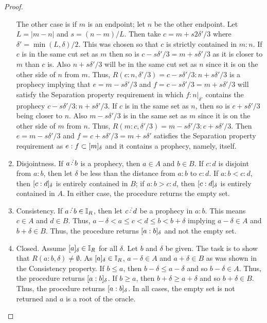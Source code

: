 \documentclass[12pt]{article}
\begin{document}
\begin{proof}
\begin{enumerate}
    The other case is if $m$ is an endpoint; let $n$ be the other endpoint. Let $L = |m-n|$ and $s = (n-m)/L$. Then take $c = m + s2\delta'/3$ where $\delta' = \min(L, \delta)/2$. This was chosen so that $c$ is strictly contained in $m:n$. If $c$ is in the same cut set as $m$ then so is $c -s \delta'/3 = m +s \delta'/3$ as it is closer to $m$ than $c$ is. Also $n + s \delta'/3$ will be in the same cut set as $n$ since it is on the other side of $n$ from $m$. Thus, $R(c:n, \delta'/3) = c-s\delta'/3 : n+s \delta'/3$ is a prophecy implying that $e=m-s\delta'/3$ and $f=c-s\delta'/3 = m + s \delta'/3$ will satisfy the Separation property requirement in which $f:n|_{\delta'}$ contains  the prophecy $c-s\delta'/3 : n+s\delta'/3$. If $c$ is in the same set as $n$, then so is $c + s \delta'/3$ being closer to $n$. Also $m-s \delta'/3$ is in the same set as $m$ since it is on the other side of $m$ from $n$.  Thus, $R(m:c, \delta'/3) =  m-s\delta'/3:c+s\delta'/3$. Then $e = m-s \delta'/3$ and $f = c + s\delta'/3 = m + s\delta'$ satisfies the Separation property requirement as $e:f \subset [m]_{\delta}$ and it contains a prophecy, namely, itself. 

    \item Disjointness. If $a\lte b$ is a prophecy, then $a \in A$ and $b \in B$. If $c:d$ is disjoint from $a:b$, then let $\delta$ be less than the distance from $a:b$ to $c:d$. If $a:b < c:d$, then $[c:d]_{\delta}$ is entirely contained in $B$; if $a:b > c:d$, then $[c:d]_{\delta}$ is entirely contained in $A$. In either case, the procedure returns the empty set. 
    
    \item Consistency. If $a \lte b \in \mathbb{I}_R$, then let $c\lte d$ be a prophecy in $a:b$. This means $c \in A$ and $d \in B$. Thus, $a-\delta < a \leq c < d \leq b < b + \delta$ implying $a-\delta \in A$ and $b+\delta \in B$. Thus, the procedure returns $[a:b]_{\delta}$ and not the empty set. 
    
    \item Closed. Assume $[a]_{\delta} \in \mathbb{I}_R$ for all $\delta$. Let $b$ and $\delta$ be given. The task is to show that $R(a:b, \delta) \neq \emptyset$. As $[a]_{\delta} \in \mathbb{I}_R$, $a-\delta \in A$ and $a+\delta \in B$ as was shown in the Consistency property. If $b \leq a$, then $b-\delta \leq a- \delta$ and so $b-\delta \in A$. Thus, the procedure returns $[a:b]_{\delta}$. If $b \geq a$, then $b+\delta \geq  a+\delta$ and so $b+\delta \in B$. Thus, the procedure returns $[a:b]_{\delta}$. In all cases, the empty set is not returned and $a$ is a root of the oracle. 
\end{enumerate}


\end{proof}
\end{document}
